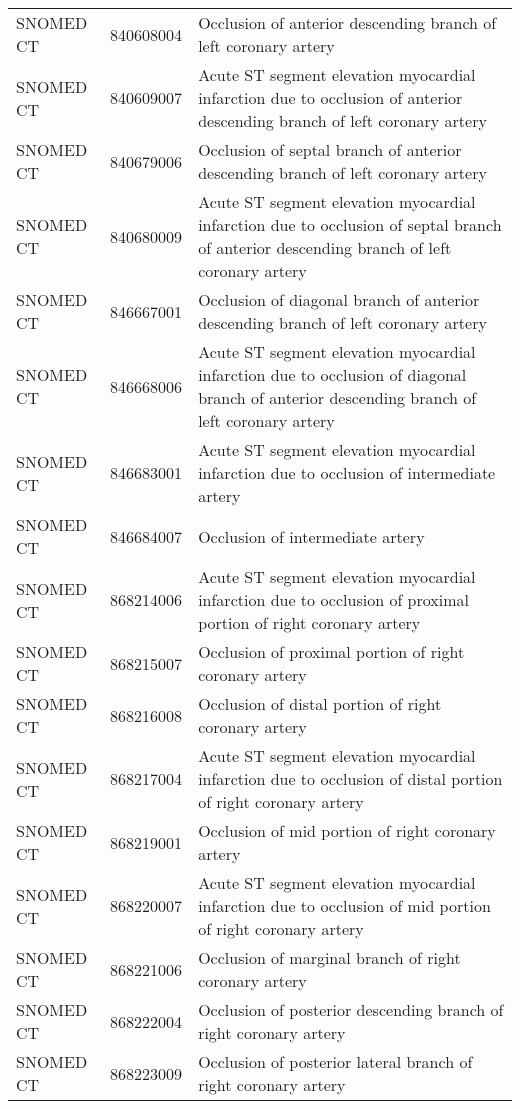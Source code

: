 \begin{longtable}{p{}p{}p{}}
  SNOMED CT & 840608004 & Occlusion of anterior descending branch of left coronary artery \\ 
  SNOMED CT & 840609007 & Acute ST segment elevation myocardial infarction due to occlusion of anterior descending branch of left coronary artery \\ 
  SNOMED CT & 840679006 & Occlusion of septal branch of anterior descending branch of left coronary artery \\ 
  SNOMED CT & 840680009 & Acute ST segment elevation myocardial infarction due to occlusion of septal branch of anterior descending branch of left coronary artery \\ 
  SNOMED CT & 846667001 & Occlusion of diagonal branch of anterior descending branch of left coronary artery \\ 
  SNOMED CT & 846668006 & Acute ST segment elevation myocardial infarction due to occlusion of diagonal branch of anterior descending branch of left coronary artery \\ 
  SNOMED CT & 846683001 & Acute ST segment elevation myocardial infarction due to occlusion of intermediate artery \\ 
  SNOMED CT & 846684007 & Occlusion of intermediate artery \\ 
  SNOMED CT & 868214006 & Acute ST segment elevation myocardial infarction due to occlusion of proximal portion of right coronary artery \\ 
  SNOMED CT & 868215007 & Occlusion of proximal portion of right coronary artery \\ 
  SNOMED CT & 868216008 & Occlusion of distal portion of right coronary artery \\ 
  SNOMED CT & 868217004 & Acute ST segment elevation myocardial infarction due to occlusion of distal portion of right coronary artery \\ 
  SNOMED CT & 868219001 & Occlusion of mid portion of right coronary artery \\ 
  SNOMED CT & 868220007 & Acute ST segment elevation myocardial infarction due to occlusion of mid portion of right coronary artery \\ 
  SNOMED CT & 868221006 & Occlusion of marginal branch of right coronary artery \\ 
  SNOMED CT & 868222004 & Occlusion of posterior descending branch of right coronary artery \\ 
  SNOMED CT & 868223009 & Occlusion of posterior lateral branch of right coronary artery \\ 

\end{longtable}
